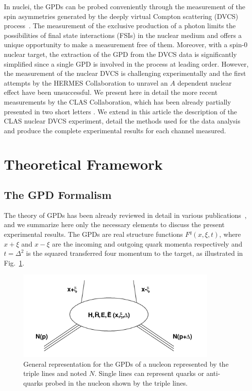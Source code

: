 \documentclass[aps,prc,preprint,superscriptaddress]{revtex4}
\begin{document}
In nuclei, the GPDs can be probed conveniently through the measurement of the
spin asymmetries generated by the deeply virtual Compton scattering (DVCS) 
process~\cite{Diehl:2003ny,Belitsky:2005qn,Boffi:2007yc,Guidal:2013rya}. The measurement of the exclusive
production of a photon limits the possibilities of final state interactions (FSIs) in the nuclear 
medium and offers a unique opportunity to make a measurement free of them. 
Moreover, with a spin-0 nuclear target, the extraction of the GPD from the DVCS data 
is significantly simplified since a single GPD is involved in the process at leading order. However, the 
measurement of the nuclear DVCS is challenging experimentally and the first attempts by 
the HERMES Collaboration \cite{Airapetian:2009cga} to unravel an $A$ dependent nuclear
effect have been unsuccessful. We present here
in detail the more recent measurements by the CLAS Collaboration, which has been already partially presented
in two short letters \cite{Hattawy:2017woc,Hattawy:2018liu}. We extend in this article 
the description of the CLAS nuclear DVCS experiment, detail the methods used for the
data analysis and produce the complete experimental results for each channel measured.


\section{Theoretical Framework}

\subsection{The GPD Formalism}

The theory of GPDs has been already reviewed in detail in various 
publications~\cite{Diehl:2003ny,Belitsky:2005qn,Boffi:2007yc,Guidal:2013rya},
and we summarize here only the necessary elements to discuss the present 
experimental results. The GPDs are real structure functions $F^{q}(x,\xi,t)$, 
where $x+\xi$ and $x-\xi$ are the incoming and outgoing quark momenta respectively 
and $t=\Delta^2$ is the squared transferred four momentum to the target, as 
illustrated in Fig.~\ref{fig:GPD}. 

\begin{figure}[tbp!]
\center
\includegraphics[width=10.0cm]{GPD.png}
\caption{General representation for the GPDs of a nucleon represented by the triple lines and noted $N$.
	Single lines can represent quarks or anti-quarks probed in the nucleon shown by the triple lines.}
\label{fig:GPD}
\end{figure}
\end{document}
